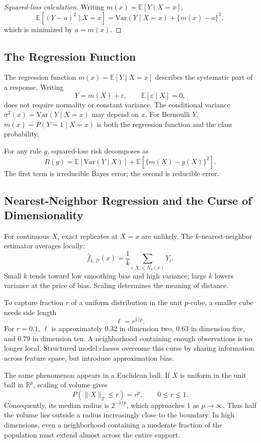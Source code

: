 \documentclass[12pt,oneside]{book}
\numberwithin{equation}{section}
\theoremstyle{definition}
\theoremstyle{plain}
\theoremstyle{remark}
\newcommand{\R}{\mathbb{R}}
\newcommand{\E}{\mathbb{E}}
\newcommand{\Var}{\mathrm{Var}}
\begin{document}
\begin{proof}[Squared-loss calculation]
Writing $m(x)=\E[Y\mid X=x]$,
\[
 \E[(Y-a)^2\mid X=x]
 =\Var(Y\mid X=x)+\{m(x)-a\}^2,
\]
which is minimized by $a=m(x)$.
\end{proof}

\subsection{The Regression Function}

The regression function $m(x)=\E[Y\mid X=x]$ describes the systematic part
of a response. Writing
\[
    Y=m(X)+\varepsilon,\qquad \E[\varepsilon\mid X]=0,
\]
does not require normality or constant variance. The conditional variance
$\sigma^2(x)=\Var(Y\mid X=x)$ may depend on $x$. For Bernoulli $Y$,
$m(x)=P(Y=1\mid X=x)$ is both the regression function and the class
probability.

For any rule $g$, squared-loss risk decomposes as
\begin{equation}
 R(g)=\E[\Var(Y\mid X)]
     +\E[\{m(X)-g(X)\}^2].
 \label{eq:bayes-risk-decomposition}
\end{equation}
The first term is irreducible Bayes error; the second is reducible error.

\subsection{Nearest-Neighbor Regression and the Curse of Dimensionality}

For continuous $X$, exact replicates at $X=x$ are unlikely. The
$k$-nearest-neighbor estimator averages locally:
\[
 \widehat f_{k,\mathcal D}(x)
 =\frac1k\sum_{i:X_i\in N_k(x)}Y_i.
\]
Small $k$ tends toward low smoothing bias and high variance; large $k$ lowers
variance at the price of bias. Scaling determines the meaning of distance.

To capture fraction $r$ of a uniform distribution in the unit $p$-cube, a
smaller cube needs side length
\begin{equation}
    \ell=r^{1/p}.
    \label{eq:curse-dimensionality}
\end{equation}
For $r=0.1$, $\ell$ is approximately $0.32$ in dimension two, $0.63$ in
dimension five, and $0.79$ in dimension ten. A neighborhood containing enough
observations is no longer local. Structured model classes overcome this curse
by sharing information across feature space, but introduce approximation bias.

The same phenomenon appears in a Euclidean ball. If $X$ is uniform in the
unit ball in $\R^p$, scaling of volume gives
\[
 P(\lVert X\rVert_2\leq r)=r^p,
 \qquad 0\leq r\leq1.
\]
Consequently, its median radius is $2^{-1/p}$, which approaches $1$ as
$p\to\infty$. Thus half the volume lies outside a radius increasingly close to
the boundary. In high dimensions, even a neighborhood containing a moderate
fraction of the population must extend almost across the entire support.
\end{document}
